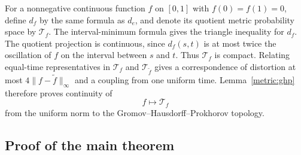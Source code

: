 For a nonnegative continuous function $f$ on $[0,1]$ with
$f(0)=f(1)=0$, define $d_f$ by the same formula as $d_e$, and denote
its quotient metric probability space by $\mathcal T_f$.
The interval-minimum formula gives the triangle inequality for $d_f$.
The quotient projection is continuous, since
$d_f(s,t)$ is at most twice the oscillation of $f$ on the interval
between $s$ and $t$. Thus $\mathcal T_f$ is compact.
Relating equal-time representatives in $\mathcal T_f$ and
$\mathcal T_{\tilde f}$ gives a correspondence of distortion at most
$4\|f-\tilde f\|_\infty$ and a coupling from one uniform time.
Lemma~\ref{metric:ghp} therefore proves continuity of
\[
 f\longmapsto \mathcal T_f
\]
from the uniform norm to the Gromov--Hausdorff--Prokhorov topology.

\subsection{Proof of the main theorem}

